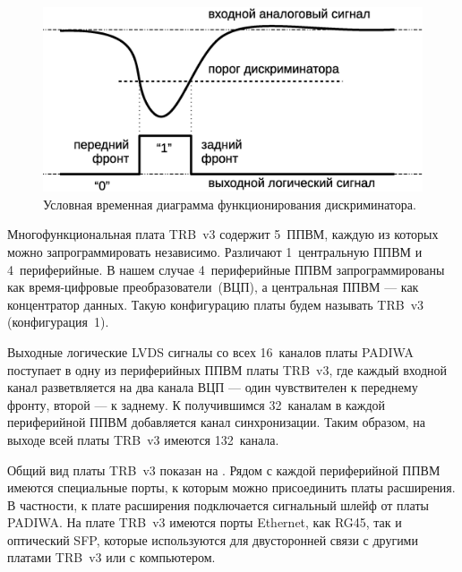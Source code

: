 \begin{figure}
\includegraphics[width=1.0\textwidth]{pictures/6_Discrimination_rus.eps}
\caption{Условная временная диаграмма функционирования дискриминатора.}
\label{fig:Discrimination}
\end{figure}

Многофункциональная плата TRB~v3 содержит 5~ППВМ, каждую из которых можно запрограммировать независимо. Различают 1~центральную ППВМ и 4~периферийные. В нашем случае 4~периферийные ППВМ запрограммированы как время-цифровые преобразователи~(ВЦП), а центральная ППВМ --- как концентратор данных. Такую конфигурацию платы будем называть TRB~v3 (конфигурация~1).

Выходные логические LVDS сигналы со всех 16~каналов платы PADIWA поступает в одну из периферийных ППВМ платы TRB~v3, где каждый входной канал разветвляется на два канала ВЦП --- один чувствителен к переднему фронту, второй --- к заднему. К получившимся 32~каналам в каждой периферийной ППВМ добавляется канал синхронизации. Таким образом, на выходе всей платы TRB~v3 имеются 132~канала.

Общий вид платы TRB~v3 показан на . Рядом с каждой периферийной ППВМ имеются специальные порты, к которым можно присоединить платы расширения. В частности, к плате расширения подключается сигнальный шлейф от платы PADIWA. На плате TRB~v3 имеются порты Ethernet, как RG45, так и оптический SFP, которые используются для двусторонней связи с другими платами TRB~v3 или с компьютером.


